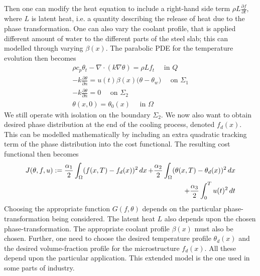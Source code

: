 Then one can modify the heat equation to include a right-hand side term $\rho L \frac{\partial f}{\partial t}$, where $L$ is latent heat, i.e. a quantity describing the release of heat due to the phase transformation. One can also vary the coolant profile, that is applied different amount of water to the different parts of the steel slab; this can modelled through varying $\beta (x)$. The parabolic PDE for the temperature evolution then becomes
\begin{align*}
    \rho c_p \theta_t - \nabla \cdot (k\nabla \theta) = \rho L f_t \quad \textrm{ in } Q \\
    - k \frac{\partial \theta}{\partial n} = u(t)\beta(x) \bigg (\theta - \theta_w \bigg ) \quad \textrm{ on } \Sigma_1 \\
    -k \frac{\partial \theta}{\partial n} = 0 \quad \textrm{ on } \Sigma_2 \\
    \theta(x,0) = \theta_0(x) \quad \textrm{ in } \Omega
\end{align*}
We still operate with isolation on the boundary $\Sigma_2$. We now also want to obtain desired phase distribution at the end of the cooling process, denoted $f_d(x)$. This can be modelled mathematically by including an extra quadratic tracking term of the phase distribution into the cost functional. The resulting cost functional then becomes
%
\begin{equation*}
\begin{aligned}
        J(\theta, f, u) := \frac{\alpha_1}{2}\int_{\Omega}(f(x,T)-f_d(x))^2\mathop{dx} + \frac{\alpha_2}{2}\int_{\Omega}(\theta(x,T) - \theta_d(x))^2\mathop{dx} \\ + \frac{\alpha_3}{2}\int_0^Tu(t)^2 \mathop{dt}
\end{aligned}
\end{equation*}
%
Choosing the appropriate function $G(f,\theta)$ depends on the particular phase-transformation being considered. The latent heat $L$ also depends upon the chosen phase-transformation. The appropriate coolant profile $\beta(x)$ must also be chosen. Further, one need to choose the desired temperature profile $\theta_d(x)$ and the desired volume-fraction profile for the microstructure $f_d(x)$. All these depend upon the particular application. This extended model is the one used in some parts of industry.
